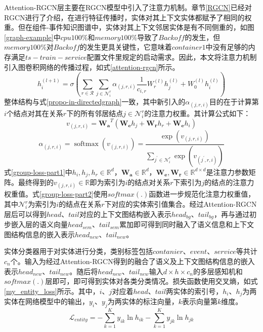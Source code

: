Attention-RGCN层主要在RGCN模型中引入了注意力机制。章节\ref{RGCN}已经对RGCN进行了介绍，在进行特征传播时，实体对其上下文实体都赋予了相同的权重。但在组件-事件知识图谱中，实体对其上下文邻居实体是有不同侧重的，如图\ref{graph-example}中$cpu 100\%$和$memory 100\%$导致了$Backoff$的发生，但$memory 100\%$对$Backoff$的发生更具关键性，它意味着$container1$中没有足够的内存满足$ts-train-service$配置文件里规定的启动需求。因此，本文将注意力机制引入图卷积网络的传播过程，如式\ref{attention-rgcn}所示。
\begin{equation}
    h_{i}^{(l+1)}=\sigma\left(\sum_{r \in \mathcal{R}} \sum_{j \in \mathcal{N}_{i}^{r}} \alpha_{(j, r, i)} \frac{1}{c_{i, r}} W_{r}^{(l)} h_{j}^{(l)}+W_{0}^{(l)} h_{i}^{(l)}\right)
    \label{attention-rgcn}
\end{equation}
整体结构与式\ref{propo-in-directedgraph}一致，其中新引入的$\alpha_{(j, r, i)}$目的在于计算第$i$个结点对其在关系$r$下的所有邻居结点$j \in \mathcal{N}_{i}^{r}$的注意力权重。其计算公式如下：
\begin{equation}
    v_{(j, r, i)}=\mathbf{W_a}^{T}\left(\mathbf{W_e} h_{j}+\mathbf{W_r} h_{r} + \mathbf{W_e} h_{i}\right)
    \label{group-loss-part1}
\end{equation}
\begin{equation}
    \alpha_{(j, r, i)}=\operatorname{softmax}\left(v_{(j, r, i)}\right)=\frac{\exp \left(v_{(j, r, i)}\right)}{\sum_{j^{\prime} \in \mathcal{N}_{i}^{r}} \exp \left(v_{\left(j^{\prime}, r, i\right)}\right)}
    \label{group-loss-part2}
\end{equation}
式\ref{group-loss-part1}中$h_i,h_j,h_r\in\mathbb{R}^{d}$，$\mathbf{W_a}\in \mathbb{R}^{d}$，$\mathbf{W_e},\mathbf{W_r} \in \mathbb{R}^{d\times d}$是注意力参数矩阵。最终得到的$ v_{(j, r, i)} \in \mathbb{R}$即为索引为$i$的结点对关系$r$下索引为$j$的结点的注意力权重值。式\ref{group-loss-part2}使用$softmax(.)$函数进一步规范化注意力权重值，其中$\mathcal{N}_{i}^{r}$为索引为$i$的结点在关系$r$下对应的实体索引值集合。经过Attention-RGCN层后可以得到$head$、$tail$对应的上下文图结构嵌入表示$head_{bg}$、$tail_{bg}$，再与通过初步嵌入层的语义向量$head_{sem}$、$tail_{sem}$累加即可得到同时融入了语义信息和上下文图结构信息的嵌入表示$head_{new}$、$tail_{new}$。

实体分类器用于对实体进行分类，类别标签包括$contanier$、$event$、$service$等共计$c_{n}$个。输入为经过Attention-RGCN得到的融合了语义及上下文图结构信息的嵌入表示$head_{new}$、$tail_{new}$。随后将$head_{new}$、$tail_{new}$输入$d \times h \times c_{n}$的多层感知机和$softmax(.)$层即可，即可得到实体对各类分类情况。损失函数使用交叉熵，如式\ref{my_entity_loss}所示。其中，$i$、$j$对应着$head$、$tail$两实体的索引号，$h_i$、$h_j$为两实体在网络模型中的输出，$y_i$、$y_j$为两实体的标注向量，$k$表示向量第$k$维度。
\begin{equation}
    \mathcal{L}_{entity}= - \sum_{k=1}^{K} y_{i k} \ln h_{i k} - \sum_{k=1}^{K} y_{j k} \ln h_{j k}
    \label{my_entity_loss}
\end{equation}

